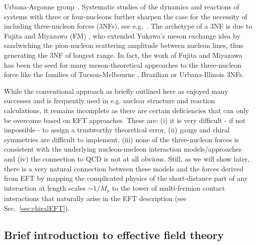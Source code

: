 \documentclass[aps,rmp,nofootinbib,twocolumn,floatfix]{revtex4}
\begin{document}
Urbana-Argonne group~\cite{Pieper:2001mp}. Systematic studies of 
the dynamics and reactions of systems with three or four-nucleons
further sharpen the case for the necessity of including three-nucleon
forces (3NFs), see e.g.~\cite{Gloeckle:1995jg}.  The archetype of a 3NF
is due to Fujita and Miyazawa (FM) \cite{Fujita:1957zz}, who extended Yukawa's
meson exchange idea by sandwiching the pion-nucleon scattering amplitude 
between nucleon lines, thus generating the 3NF of longest range.
In fact, the work of Fujita and Miyazawa has been the seed for many 
meson-theoretical approaches to the three-nucleon force like the families 
of Tucson-Melbourne \cite{TM1,Coon:1974vc},  Brazilian \cite{Coelho:1984hk} or 
Urbana-Illinois \cite{Pudliner:1997ck,Pieper:2001ap} 3NFs. 

While the conventional approach as briefly outlined here as enjoyed
many successes and is frequently used in e.g. nuclear structure and reaction
calculations, it remains incomplete as there are certain deficiencies
that can only be overcome based on EFT approaches. These are: (i) it is
very difficult - if not impossible - to assign a trustworthy theoretical
error, (ii) gauge and chiral symmetries are difficult to implement, (iii)
none of the three-nucleon forces is consistent with the underlying 
nucleon-nucleon interaction models/approaches and (iv) the connection
to QCD is not at all obvious. Still, as we will show later, there is
a very natural connection between these models and the forces derived 
from EFT by mapping the complicated physics of the short-distance
part of any interaction at length scales $\sim 1/M_\rho$ to the tower 
of multi-fermion contact interactions that naturally arise in the EFT description
(see Sec.~\ref{sec:chiralEFT}).

\subsection{Brief introduction to effective field theory}
\label{sec:EFTintro}
\end{document}
